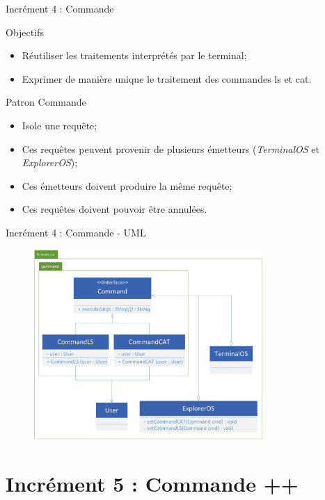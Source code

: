 \documentclass[utf8, 14pt]{beamer}
\begin{document}
	\begin{frame}{Incrément 4 : Commande}
		\begin{block}{Objectifs}
		\begin{itemize}
		\item Réutiliser les traitements interprétés par le terminal;
		\item Exprimer de manière unique le traitement des commandes ls et cat.
		\end{itemize}
		\end{block}
		
		\begin{exampleblock}{Patron Commande}
		\begin{itemize}
		\item Isole une requête;
		\item Ces requêtes peuvent provenir de plusieurs émetteurs (\emph{TerminalOS} et \emph{ExplorerOS});
		\item Ces émetteurs doivent produire la même requête;
		\item Ces requêtes doivent pouvoir être annulées.
		\end{itemize}
		\end{exampleblock}					
	\end{frame}

	\begin{frame}{Incrément 4 : Commande - UML}
		\begin{figure}[!h]
		\centering
		\includegraphics[width=0.78\textwidth]{../uml/uml-command}
		\end{figure}		
	\end{frame}

\section{Incrément 5 : Commande ++}
	
\end{document}
